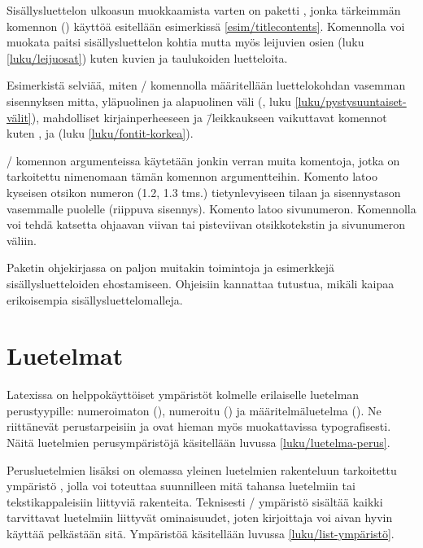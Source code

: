 Sisällysluettelon ulkoasun muokkaamista varten on paketti
, jonka tärkeimmän komennon
() käyttöä esitellään esimerkissä
\ref{esim/titlecontents}. Komennolla voi muokata paitsi
sisällysluettelon kohtia mutta myös leijuvien osien (luku
\ref{luku/leijuosat}) kuten kuvien ja taulukoiden luetteloita.

Esimerkistä selviää, miten \-/ komennolla
määritellään luettelokohdan vasemman sisennyksen mitta, yläpuolinen ja
alapuolinen väli (, luku
\ref{luku/pystysuuntaiset-välit}), mahdolliset kirjainperheeseen ja
\=/leikkaukseen vaikuttavat komennot kuten ,
 ja  (luku \ref{luku/fontit-korkea}).

\-/ komennon argumenteissa käytetään jonkin
verran muita komentoja, jotka on tarkoitettu nimenomaan tämän komennon
argumentteihin. Komento  latoo kyseisen otsikon
numeron (1.2, 1.3 tms.) tietynlevyiseen tilaan ja sisennystason
vasemmalle puolelle (riippuva sisennys). Komento 
latoo sivunumeron. Komennolla  voi tehdä katsetta
ohjaavan viivan tai pisteviivan otsikkotekstin ja sivunumeron väliin.

Paketin  ohjekirjassa on paljon muitakin
toimintoja ja esimerkkejä sisällysluetteloiden ehostamiseen. Ohjeisiin
kannattaa tutustua, mikäli kaipaa erikoisempia sisällysluettelomalleja.

\section{Luetelmat}
\label{luku/luetelmat}

Latexissa on helppokäyttöiset ympäristöt kolmelle erilaiselle luetelman
perustyypille: numeroimaton (), numeroitu
() ja määritelmäluetelma ().
Ne riittänevät perustarpeisiin ja ovat hieman myös muokattavissa
typografisesti. Näitä luetelmien perusympäristöjä käsitellään luvussa
\ref{luku/luetelma-perus}.

Perusluetelmien lisäksi on olemassa yleinen luetelmien rakenteluun
tarkoitettu ympäristö , jolla voi toteuttaa suunnilleen
mitä tahansa luetelmiin tai tekstikappaleisiin liittyviä rakenteita.
Teknisesti \-/ ympäristö sisältää kaikki tarvittavat
luetelmiin liittyvät ominaisuudet, joten kirjoittaja voi aivan hyvin
käyttää pelkästään sitä. Ympäristöä käsitellään luvussa
\ref{luku/list-ympäristö}.


